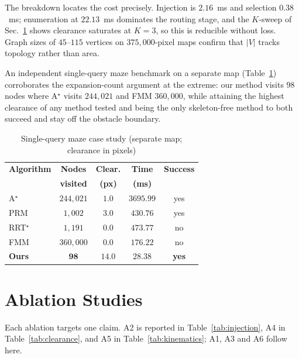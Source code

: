 \documentclass[conference]{IEEEtran}
\begin{document}
The breakdown locates the cost precisely. Injection is $2.16$~ms and selection $0.38$~ms; enumeration at $22.13$~ms dominates the routing stage, and the $K$-sweep of Sec.~\ref{sec:ablation} shows clearance saturates at $K=3$, so this is reducible without loss. Graph sizes of $45$--$115$ vertices on $375{,}000$-pixel maps confirm that $|V|$ tracks topology rather than area.

An independent single-query maze benchmark on a separate map (Table~\ref{tab:maze}) corroborates the expansion-count argument at the extreme: our method visits $98$ nodes where A$^\star$ visits $244{,}021$ and FMM $360{,}000$, while attaining the highest clearance of any method tested and being the only skeleton-free method to both succeed and stay off the obstacle boundary.

\begin{table}[htbp]
\caption{Single-query maze case study (separate map; clearance in pixels)}
\label{tab:maze}
\begin{center}
\begin{tabular}{@{}lcccc@{}}
\toprule
\textbf{Algorithm} & \textbf{Nodes} & \textbf{Clear.} & \textbf{Time} & \textbf{Success} \\
& \textbf{visited} & \textbf{(px)} & \textbf{(ms)} & \\ \midrule
A$^\star$ & $244{,}021$ & $1.0$ & $3695.99$ & yes \\
PRM & $1{,}002$ & $3.0$ & $430.76$ & yes \\
RRT$^\star$ & $1{,}191$ & $0.0$ & $473.77$ & no \\
FMM & $360{,}000$ & $0.0$ & $176.22$ & no \\
\textbf{Ours} & $\mathbf{98}$ & $\mathbf{14.0}$ & $\mathbf{28.38}$ & \textbf{yes} \\ \bottomrule
\end{tabular}
\end{center}
\end{table}

\section{Ablation Studies}
\label{sec:ablation}

Each ablation targets one claim. A2 is reported in Table~\ref{tab:injection}, A4 in Table~\ref{tab:clearance}, and A5 in Table~\ref{tab:kinematics}; A1, A3 and A6 follow here.
\end{document}
